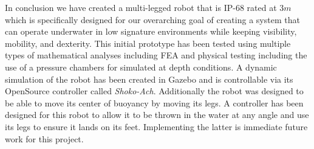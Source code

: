 In conclusion we have created a multi-legged robot that is IP-68 rated at 3$m$ which is specifically designed for our overarching goal of creating a system that can operate underwater in low signature environments while keeping visibility, mobility, and dexterity.
This initial prototype has been tested using multiple types of mathematical analyses including FEA and physical testing including the use of a pressure chambers for simulated at depth conditions.
A dynamic simulation of the robot has been created in Gazebo and is controllable via its OpenSource controller called \textit{Shoko-Ach}.
Additionally the robot was designed to be able to move its center of buoyancy by moving its legs.
A controller has been designed for this robot to allow it to be thrown in the water at any angle and use its legs to ensure it lands on its feet.
Implementing the latter is immediate future work for this project.
